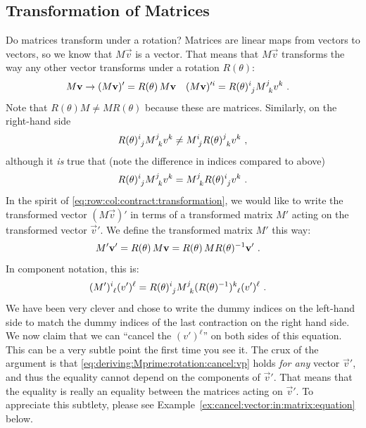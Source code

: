 \documentclass[12pt]{article}
\begin{document}
\subsection{Transformation of Matrices}
\label{sec:transformation:of:matrices}

Do matrices transform under a rotation? Matrices are linear maps from vectors to vectors, so we know that $M\vec{v}$ is a vector. That means that $M\vec{v}$ transforms the way any other vector transforms under a rotation $R(\theta)$:
\begin{align}
    M\vec{v} \to (M\vec{v})' &= R(\theta)\, M\vec{v} 
    &
    (M\vec{v})'^i  &= R(\theta)\aij{i}{j} M\aij{j}{k}v^k 
    \ .
\end{align}
Note that $R(\theta)M \neq M R(\theta)$ because these are matrices. Similarly, on the right-hand side 
\begin{align}
    R(\theta)\aij{i}{j} M\aij{j}{k}v^k \neq 
    M\aij{i}{j} R(\theta)\aij{j}{k} v^k \ ,
\end{align}
although it \emph{is} true that (note the difference in indices compared to above)
\begin{align}
    R(\theta)\aij{i}{j} M\aij{j}{k}v^k =
    M\aij{j}{k} R(\theta)\aij{i}{j} v^k \ .
\end{align}
In the spirit of \eqref{eq:row:col:contract:transformation}, we would like to write the transformed vector $(M\vec{v})'$ in terms of a transformed matrix $M'$ acting on the transformed vector $\vec{v}'$. We define the transformed matrix $M'$ this way:
\begin{align}
    M' \mathbf{v}' &= R(\theta)\, M\mathbf{v} = R(\theta)\, M R(\theta)^{-1} \mathbf{v}'   \ .
\end{align}
In component notation, this is:
\begin{align}
    (M')\aij{i}{\ell} (v')^\ell &= 
    R(\theta)\aij{i}{j}
    M\aij{j}{k}
    (R(\theta)\inv)\aij{k}{\ell}
    (v')^\ell \ .
    \label{eq:deriving:Mprime:rotation:cancel:vp}
\end{align}
We have been very clever and chose to write the dummy indices on the left-hand side to match the dummy indices of the last contraction on the right hand side. We now claim that we can ``cancel the $(v')^\ell$'' on both sides of this equation. This can be a very subtle point the first time you see it. The crux of the argument is that \eqref{eq:deriving:Mprime:rotation:cancel:vp} holds \emph{for any} vector $\vec{v}'$, and thus the equality cannot depend on the components of $\vec{v}'$. That means that the equality is really an equality between the matrices acting on $\vec{v}'$. To appreciate this subtlety, please see Example~\ref{ex:cancel:vector:in:matrix:equation} below.
\end{document}
